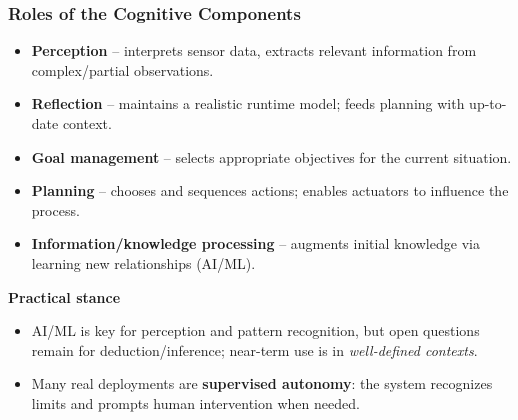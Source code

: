 \begin{frame}
	\frametitle{Roles of the Cognitive Components}
  \begin{itemize}
    \item \textbf{Perception} -- interprets sensor data, extracts relevant information from complex/partial observations.
    \item \textbf{Reflection} -- maintains a realistic runtime model; feeds planning with up-to-date context.
    \item \textbf{Goal management} -- selects appropriate objectives for the current situation.
    \item \textbf{Planning} -- chooses and sequences actions; enables actuators to influence the process.
    \item \textbf{Information/knowledge processing} -- augments initial knowledge via learning new relationships (AI/ML).
  \end{itemize}
  \vspace{2mm}
  \textbf{Practical stance}
  \begin{itemize}
    \item AI/ML is key for perception and pattern recognition, but open questions remain for deduction/inference; near-term use is in \emph{well-defined contexts}.
    \item Many real deployments are \textbf{supervised autonomy}: the system recognizes limits and prompts human intervention when needed.
  \end{itemize}
\end{frame}
